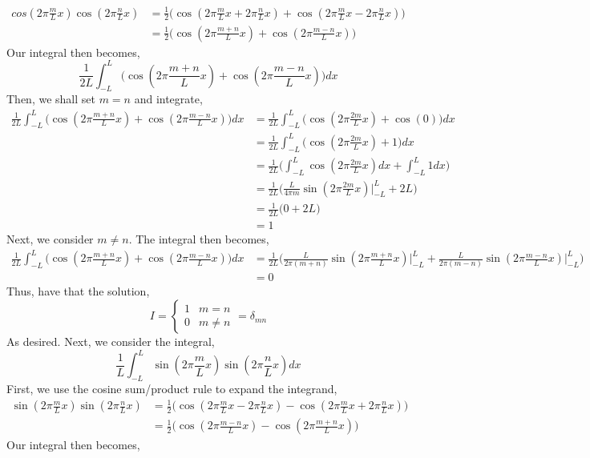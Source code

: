 \documentclass[letterpaper,10pt]{article}
\begin{document}
\begin{enumerate}
\begin{align*}
cos(2\pi \frac{m}{L} x)\cos(2\pi \frac{n}{L} x) &= \frac{1}{2}\bigg(\cos(2\pi \frac{m}{L} x+2\pi \frac{n}{L} x)+\cos(2\pi \frac{m}{L} x-2\pi \frac{n}{L} x)\bigg)\\
&=\frac{1}{2}\bigg(\cos(2\pi \frac{m+n}{L} x)+\cos(2\pi \frac{m-n}{L} x)\bigg)
\end{align*}
Our integral then becomes,
\[\frac{1}{2L}\int_{-L}^L\bigg(\cos(2\pi \frac{m+n}{L} x)+\cos(2\pi \frac{m-n}{L} x)\bigg)dx\]
Then, we shall set $m=n$ and integrate,
\begin{align*}
\frac{1}{2L}\int_{-L}^L\bigg(\cos(2\pi \frac{m+n}{L} x)+\cos(2\pi \frac{m-n}{L} x)\bigg)dx &= \frac{1}{2L}\int_{-L}^L\bigg(\cos(2\pi \frac{2m}{L} x)+\cos(0)\bigg)dx\\
&= \frac{1}{2L}\int_{-L}^L\bigg(\cos(2\pi \frac{2m}{L} x)+1\bigg)dx\\
&= \frac{1}{2L}\bigg(\int_{-L}^L\cos(2\pi \frac{2m}{L} x)dx+\int_{-L}^L1dx\bigg)\\
&=\frac{1}{2L}\bigg(\frac{L}{4\pi m}\sin(2\pi \frac{2m}{L} x)\bigg|_{-L}^L+2L\bigg)\\
&=\frac{1}{2L}\bigg(0+2L)\\
&=1
\end{align*}
Next, we consider $m\neq n$. The integral then becomes,
\begin{align*}
\frac{1}{2L}\int_{-L}^L\bigg(\cos(2\pi \frac{m+n}{L} x)+\cos(2\pi \frac{m-n}{L} x)\bigg)dx &= \frac{1}{2L}\bigg(\frac{L}{2\pi(m+n)}\sin(2\pi \frac{m+n}{L} x)\bigg|_{-L}^L+\frac{L}{2\pi(m-n)}\sin(2\pi \frac{m-n}{L} x)\bigg|_{-L}^L\bigg)\\
&=0
\end{align*}
Thus, have that the solution,
\[I=\begin{cases}
1 & m=n\\
0 & m\neq n
\end{cases}=\delta_{mn}\]
As desired. Next, we consider the integral,
\begin{equation}
\frac{1}{L}\int_{-L}^L\sin(2\pi \frac{m}{L} x)\sin(2\pi \frac{n}{L} x)dx
\end{equation}
First, we use the cosine sum/product rule to expand the integrand,
\begin{align*}
\sin(2\pi \frac{m}{L} x)\sin(2\pi \frac{n}{L} x) &= \frac{1}{2}\bigg(\cos(2\pi \frac{m}{L} x-2\pi \frac{n}{L} x)-\cos(2\pi \frac{m}{L} x+2\pi \frac{n}{L} x)\bigg)\\
&= \frac{1}{2}\bigg(\cos(2\pi \frac{m-n}{L} x)-\cos(2\pi \frac{m+n}{L} x)\bigg)
\end{align*}
Our integral then becomes,

\end{enumerate}
\end{document}
